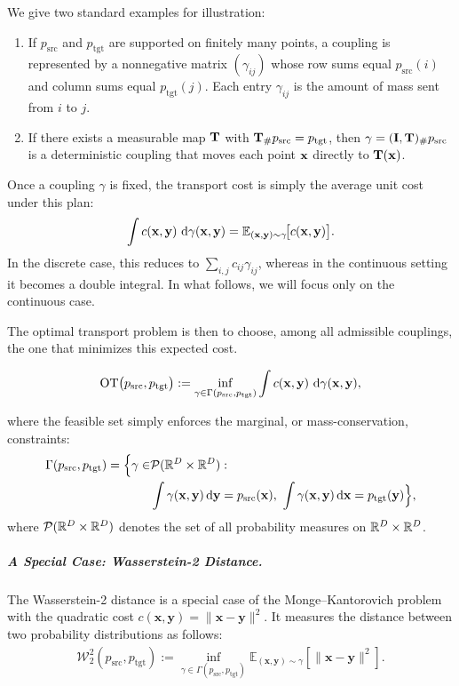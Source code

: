 We give two standard examples for illustration:
\begin{enumerate}
    \item {}  
    If $p_{\mathrm{src}}$ and $p_{\mathrm{tgt}}$ are supported on finitely many points, a coupling is
    represented by a nonnegative matrix $(\gamma_{ij})$ whose row sums equal $p_{\mathrm{src}}(i)$ and
    column sums equal $p_{\mathrm{tgt}}(j)$. Each entry $\gamma_{ij}$ is the amount of mass sent from
    $i$ to $j$.
    \item {}  
    If there exists a measurable map ${\mathbf{T}}$ with ${\mathbf{T}}_\#p_{\mathrm{src}}=p_{\mathrm{tgt}}$, then
    $\gamma=({\mathbf{I}},{\mathbf{T}})_\#p_{\mathrm{src}}$ is a deterministic coupling that moves each point
    ${\mathbf{x}}$ directly to ${\mathbf{T}}({\mathbf{x}})$.
\end{enumerate}

Once a coupling $\gamma$ is fixed, the transport cost is simply the average unit cost under this plan:
\[
\int c({\mathbf{x}},{\mathbf{y}})\,\mathop{}\!\mathrm{d}\gamma({\mathbf{x}},{\mathbf{y}})
=\mathbb{E}_{({\mathbf{x}},{\mathbf{y}})\sim\gamma}\!\big[c({\mathbf{x}},{\mathbf{y}})\big].
\]
In the discrete case, this reduces to $\sum_{i,j} c_{ij}\gamma_{ij}$, whereas in
the continuous setting it becomes a double integral. In what follows, we will
focus only on the continuous case.

The optimal transport problem is then to choose, among all admissible couplings,
the one that minimizes this expected cost.
\begin{mdframed}
\begin{equation}\label{eq:ot}
\mathrm{OT}\big(p_{\mathrm{src}},p_{\mathrm{tgt}}\big)
:= \inf_{\gamma\in\Gamma(p_{\mathrm{src}},p_{\mathrm{tgt}})}
\int c({\mathbf{x}},{\mathbf{y}})\,\mathop{}\!\mathrm{d}\gamma({\mathbf{x}},{\mathbf{y}}),
\end{equation}
\end{mdframed}
where the feasible set simply enforces the marginal, or mass-conservation, constraints:
\begin{align*}
    \Gamma(p_{\mathrm{src}},p_{\mathrm{tgt}})
= \Big\{\gamma \in &\mathcal{P}(\mathbb{R}^D\times\mathbb{R}^D): \\
&\int \gamma({\mathbf{x}},{\mathbf{y}}) \mathop{}\!\mathrm{d} {\mathbf{y}} = p_{\mathrm{src}}({\mathbf{x}}),\,\,
\int \gamma({\mathbf{x}},{\mathbf{y}})\mathop{}\!\mathrm{d} {\mathbf{x}} = p_{\mathrm{tgt}}({\mathbf{y}})\Big\},
\end{align*}
where $\mathcal{P}(\mathbb{R}^D\times\mathbb{R}^D)$ denotes the set of all probability measures on
$\mathbb{R}^D\times\mathbb{R}^D$.  


\subparagraph{A Special Case: Wasserstein-2 Distance.}

The Wasserstein-2 distance  is a special case of the Monge--Kantorovich problem with the quadratic cost $c(\mathbf{x}, \mathbf{y}) = \|\mathbf{x} - \mathbf{y}\|^2$. It measures the distance between two probability distributions as follows:
\begin{align*}
 \mathcal{W}_2^2(p_{\mathrm{src}}, p_{\mathrm{tgt}}) := \inf_{\gamma \in \Gamma(p_{\mathrm{src}}, p_{\mathrm{tgt}})} \mathbb{E}_{(\mathbf{x}, \mathbf{y}) \sim \gamma} \left[ \|\mathbf{x} - \mathbf{y}\|^2 \right].
\end{align*}

